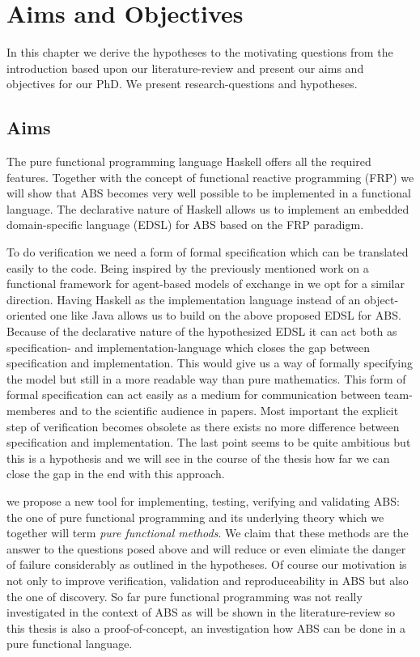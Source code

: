 \chapter{Aims and Objectives}
\label{chap:aimsObj}

In this chapter we derive the hypotheses to the motivating questions from the introduction based upon our literature-review and present our aims and objectives for our PhD. We present research-questions and hypotheses.

\section{Aims}
The pure functional programming language Haskell offers all the required features. Together with the concept of functional reactive programming (FRP) we will show that ABS becomes very well possible to be implemented in a functional language. The declarative nature of Haskell allows us to implement an embedded domain-specific language (EDSL) for ABS based on the FRP paradigm.

To do verification we need a form of formal specification which can be translated easily to the code. Being inspired by the previously mentioned work on a functional framework for agent-based models of exchange in \cite{botta_functional_2011} we opt for a similar direction. Having Haskell as the implementation language instead of an object-oriented one like Java allows us to build on the above proposed EDSL for ABS. Because of the declarative nature of the hypothesized EDSL it can act both as specification- and implementation-language which closes the gap between specification and implementation. This would give us a way of formally specifying the model but still in a more readable way than pure mathematics. This form of formal specification can act easily as a medium for communication between team-memberes and to the scientific audience in papers. Most important the explicit step of verification becomes obsolete as there exists no more difference between specification and implementation. The last point seems to be quite ambitious but this is a hypothesis and we will see in the course of the thesis how far we can close the gap in the end with this approach.

we propose a new tool for implementing, testing, verifying and validating ABS: the one of pure functional programming and its underlying theory which we together will term \textit{pure functional methods}. We claim that these methods are the answer to the questions posed above and will reduce or even elimiate the danger of failure considerably as outlined in the hypotheses. 
Of course our motivation is not only to improve verification, validation and reproduceability in ABS but also the one of discovery. So far pure functional programming was not really investigated in the context of ABS as will be shown in the literature-review so this thesis is also a proof-of-concept, an investigation how ABS can be done in a pure functional language.

